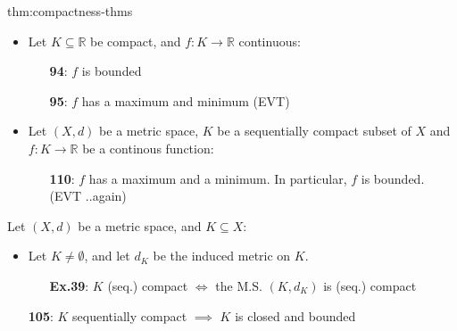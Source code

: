\documentclass[landscape, 8pt]{extarticle}
\begin{document}
\begin{multicols}{3}
\begin{thm}{thm:compactness-thms}{}
    \vspace{-8pt}
    \vspace{-7pt}
    \begin{itemize}[leftmargin=1.5em]
        \item Let $K \subseteq \mathbb{R}$ be compact, and $f : K \to \mathbb{R}$ continuous:
            \vspace{-5pt}
            \begin{itemize}
                \item[\textbf{94}:] $f$ is bounded
                \item[\textbf{95}:] $f$ has a maximum and minimum (EVT)
            \end{itemize}
        \vspace{-5pt}
        \item Let $(X, d)$ be a metric space, $K$ be a sequentially compact subset of $X$ and $f : K \to \mathbb{R}$ be a continous function:
            \vspace{-5pt}
            \begin{itemize}
                \item[\textbf{110}:] $f$ has a maximum and a minimum. In particular, $f$ is bounded. (EVT ..again)
            \end{itemize} 
    \end{itemize}

    \vspace{-5pt}
    \vspace{-3pt}

    Let $(X, d)$ be a metric space, and $K \subseteq X$:
    \vspace{-5pt}
    \begin{itemize}[leftmargin=1.5em]
        \item Let $K\ne\emptyset$, and let $d_{K}$ be the induced metric on $K$.
            \vspace{-3pt}
            \begin{itemize}
                \item[\textbf{Ex.39}:] $K$ (seq.) compact $\iff$ the M.S. $(K, d_{K})$ is (seq.) compact
            \end{itemize}
            
            \vspace{-2pt}
        \item[\textbf{105}:] $K$ sequentially compact $\implies$ $K$ is closed and bounded


\end{itemize}
\end{thm}
\end{multicols}
\end{document}
